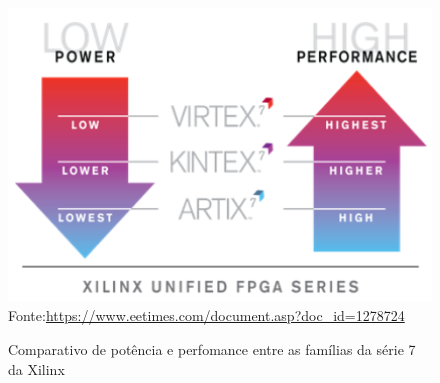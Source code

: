 \begin{figure}[H]
	\centering
	\caption{Comparativo de potência e perfomance entre as famílias da série 7 da Xilinx}
	\includegraphics[width=15cm]{figures/xi-lite-01.png}
	{Fonte:\url{https://www.eetimes.com/document.asp?doc_id=1278724}}
	\label{comparative}
\end{figure}